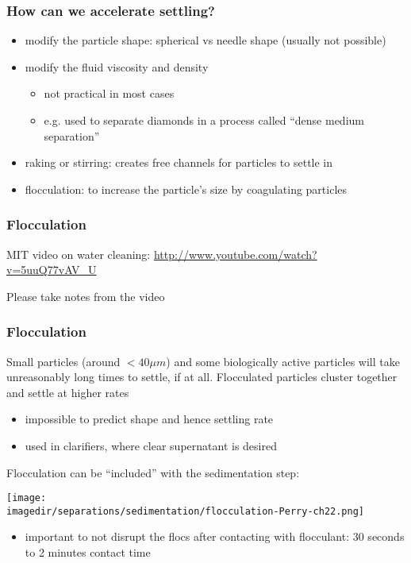 \begin{frame}\frametitle{How can we accelerate settling?}
	\begin{itemize}
		\item	modify the particle shape: spherical vs needle shape (usually not possible)
		\item	modify the fluid viscosity and density
		\begin{itemize}
			\item	not practical in most cases
			\item	e.g. used to separate diamonds in a process called ``dense medium separation''
		\end{itemize}
		\item	raking or stirring: creates free channels for particles to settle in
		\item	flocculation: to increase the particle's size by coagulating particles
	\end{itemize}
\end{frame}

\begin{frame}\frametitle{Flocculation}
	MIT video on water cleaning: \href{http://www.youtube.com/watch?v=5uuQ77vAV\_U}{http://www.youtube.com/watch?v=5uuQ77vAV\_U}

	\vspace{7cm}
	{\tiny Please take notes from the video}
\end{frame}

\begin{frame}\frametitle{Flocculation}
	Small particles (around $< 40 \mu m$) and some biologically active particles will take unreasonably long times to settle, if at all.
	\vspace{12pt}
	Flocculated particles cluster together and settle at higher rates
	\begin{itemize}
		\item	impossible to predict shape and hence settling rate
		\item	used in clarifiers, where clear supernatant is desired
	\end{itemize}
	\vspace{12pt}
	Flocculation can be ``included'' with the sedimentation step:
	\begin{center}
		\texttt{[image: \\imagedir/separations/sedimentation/flocculation-Perry-ch22.png]}
	\end{center}
	\begin{itemize}
		\item	important to not disrupt the flocs after contacting with flocculant: 30 seconds to 2 minutes contact time
	\end{itemize}
\end{frame}


